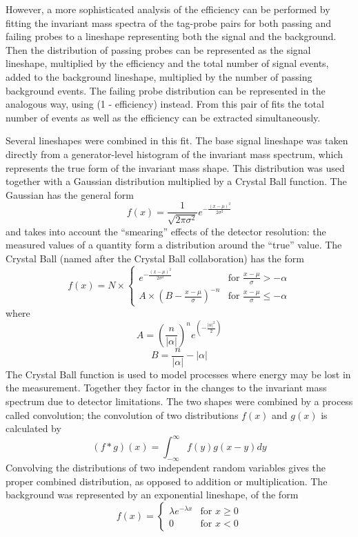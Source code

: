 However, a more sophisticated analysis of the efficiency can 
be performed by fitting the invariant mass spectra of the
tag-probe pairs for both passing and failing probes to a 
lineshape representing both the signal and the background.  
Then the distribution of passing probes can be represented as 
the signal lineshape, multiplied by the efficiency and the
total number of signal events, added to the background lineshape, 
multiplied by the number of passing background events.  
The failing probe distribution can be represented in the 
analogous way, using (1 - efficiency) instead.  
From this pair of fits the total number of events as well as 
the efficiency can be extracted simultaneously.  

Several lineshapes were combined in this fit.  
The base signal lineshape was taken directly from a generator-level 
histogram of the \Zee invariant mass spectrum, %
which represents the true form of the invariant mass shape.  
This distribution was used together with a Gaussian distribution 
multiplied by a Crystal Ball function.  
The Gaussian has the general form 
\[
f(x) = \frac{1}{\sqrt{2\pi\sigma^2}} e^{-\frac{(x-\mu)^2}{2\sigma^2}}
\]
and takes into account the ``smearing'' effects 
of the detector resolution: 
the measured values of a quantity form a distribution 
around the ``true'' value.  
The Crystal Ball (named after the Crystal Ball collaboration) has the form
\[
f(x) = N \times 
\begin{cases}
e^{-\frac{(x-\mu)^2}{2\sigma^2}} & \text{for } \frac{x-\mu}{\sigma} > -\alpha \\
A \times \left(B - \frac{x-\mu}{\sigma} \right)^{-n} & \text{for } \frac{x-\mu}{\sigma} \leq -\alpha
\end{cases}
\]
where
\[
A = \left( \frac{n}{|\alpha|} \right)^n e^{\left( -\frac{|\alpha|^2}{2} \right)}
\]
\[
B = \frac{n}{|\alpha|} - |\alpha|
\]
The Crystal Ball function is used to 
model processes where energy may be lost 
in the measurement.  
Together they factor in the changes to the invariant mass 
spectrum due to detector limitations.  
The two shapes were combined by a process called convolution; 
the convolution of two distributions $f(x)$ and $g(x)$ is calculated by 
\[
(f * g)(x) = \int_{-\infty}^{\infty} f(y) g(x - y) dy
\]
Convolving the distributions of two independent random variables 
gives the proper combined distribution, 
as opposed to addition or multiplication.  
The background was represented by an exponential lineshape, of the form 
\[
f(x) = 
\begin{cases}
\lambda e^{-\lambda x} & \text{for } x \geq 0 \\
0 & \text{for } x < 0
\end{cases}
\]
